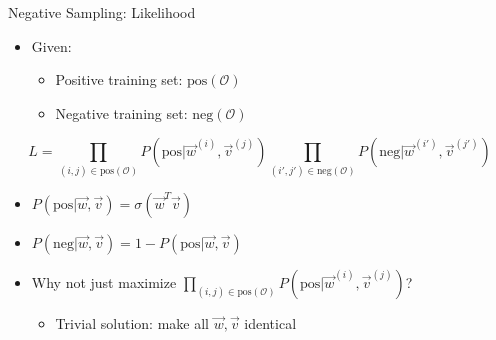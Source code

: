 \begin{vbframe}{Negative Sampling: Likelihood}

\vfill

\begin{itemize}
	\item Given:
		\begin{itemize}
			\item Positive training set: $\mathrm{pos}(\mathcal{O})$
			\item Negative training set: $\mathrm{neg}(\mathcal{O})$
		\end{itemize}
\end{itemize}

	$$ L = \prod_{(i,j) \in \mathrm{pos}(\mathcal{O})} P(\mathrm{pos}|\vec w^{(i)}, \vec v^{(j)}) \prod_{(i',j') \in \mathrm{neg}(\mathcal{O})} P(\mathrm{neg}|\vec w^{(i')},\vec v^{(j')} ) $$
	
\begin{itemize}
	\item $P(\mathrm{pos}|\vec w, \vec v) = \sigma(\vec w^T \vec v)$
	\item $P(\mathrm{neg}|\vec w, \vec v) = 1-P(\mathrm{pos}|\vec w, \vec v)$
	\item \ques Why not just maximize $\displaystyle \prod_{(i,j) \in \mathrm{pos}(\mathcal{O})} P(\mathrm{pos}|\vec w^{(i)}, \vec v^{(j)}) $?
		\begin{itemize}
		\item Trivial solution: make all $\vec w, \vec v$ identical
		\end{itemize}
\end{itemize}

\vfill

\end{vbframe}


